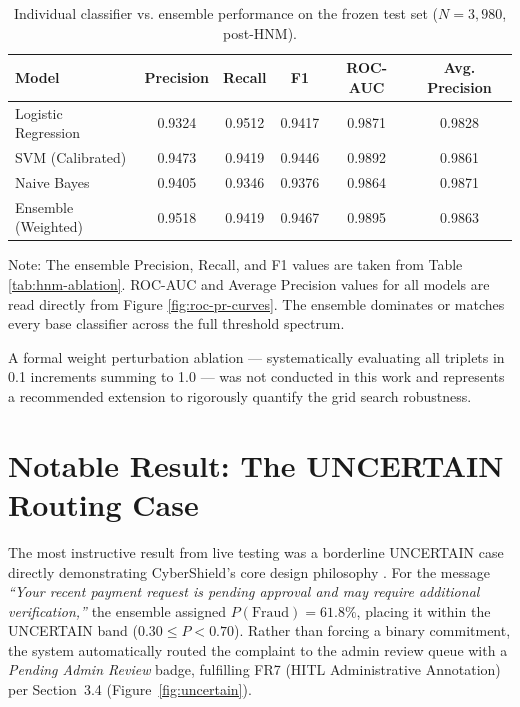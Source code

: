 \begin{table}[H]
    \centering
    \caption{Individual classifier vs. ensemble performance on the frozen test set ($N = 3{,}980$, post-HNM).}
    \label{tab:individual_vs_ensemble}
    \begin{tabular}{|l|c|c|c|c|c|}
    \hline
    \textbf{Model} & \textbf{Precision} & \textbf{Recall} & \textbf{F1} & \textbf{ROC-AUC} & \textbf{Avg. Precision} \\ \hline
    Logistic Regression & 0.9324 & 0.9512 & 0.9417 & 0.9871 & 0.9828 \\ \hline
    SVM (Calibrated)    & 0.9473 & 0.9419 & 0.9446 & 0.9892 & 0.9861 \\ \hline
    Naive Bayes         & 0.9405 & 0.9346 & 0.9376 & 0.9864 & 0.9871 \\ \hline
    Ensemble (Weighted) & 0.9518 & 0.9419 & 0.9467 & 0.9895 & 0.9863 \\ \hline
    \end{tabular}
    
    \vspace{1ex}
    \small Note: The ensemble Precision, Recall, and F1 values are taken from Table \ref{tab:hnm-ablation}. ROC-AUC and Average Precision values for all models are read directly from Figure \ref{fig:roc-pr-curves}. The ensemble dominates or matches every base classifier across the full threshold spectrum.
\end{table}

A formal weight perturbation ablation --- systematically evaluating all triplets in 0.1 increments summing to 1.0 --- was not conducted in this work and represents a recommended extension to rigorously quantify the grid search robustness.

\section{Notable Result: The UNCERTAIN Routing Case}

The most instructive result from live testing was a borderline UNCERTAIN case directly demonstrating CyberShield's core design philosophy \cite{holzinger2016interactive}. For the message \textit{``Your recent payment request is pending approval and may require additional verification,''} the ensemble assigned $P(\text{Fraud}) = 61.8\%$, placing it within the UNCERTAIN band ($0.30 \leq P < 0.70$). Rather than forcing a binary commitment, the system automatically routed the complaint to the admin review queue with a \textit{Pending Admin Review} badge, fulfilling FR7 (HITL Administrative Annotation) per Section~3.4 (Figure~\ref{fig:uncertain}).

